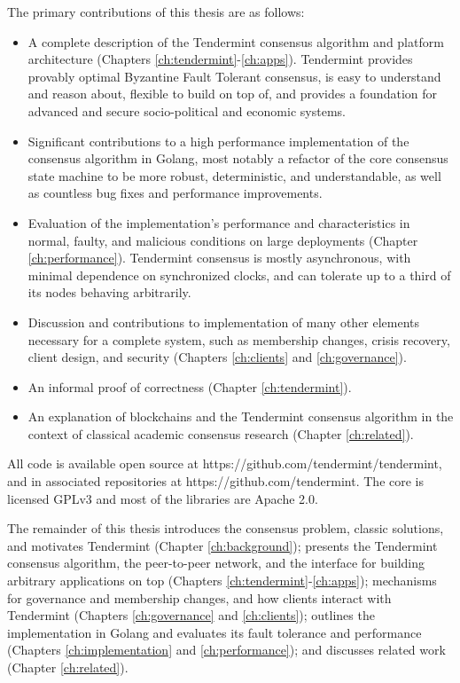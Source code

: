 The primary contributions of this thesis are as follows:


\begin{itemize}  

    \item A complete description of the Tendermint consensus algorithm and platform architecture (Chapters \ref{ch:tendermint}-\ref{ch:apps}). Tendermint provides provably optimal Byzantine Fault Tolerant consensus, is easy to understand and reason about, flexible to build on top of, and provides a foundation for advanced and secure socio-political and economic systems. 

    \item Significant contributions to a high performance implementation of the consensus algorithm in Golang, most notably a refactor of the core consensus state machine to be more robust, deterministic, and understandable, as well as countless bug fixes and performance improvements.

    \item Evaluation of the implementation's performance and characteristics in normal, faulty, and malicious conditions on large deployments (Chapter \ref{ch:performance}). Tendermint consensus is mostly asynchronous, with minimal dependence on synchronized clocks, and can tolerate up to a third of its nodes behaving arbitrarily. 

    \item Discussion and contributions to implementation of many other elements necessary for a complete system, such as membership changes, crisis recovery, client design, and security (Chapters \ref{ch:clients} and \ref{ch:governance}).

    \item An informal proof of correctness (Chapter \ref{ch:tendermint}).

    \item An explanation of blockchains and the Tendermint consensus algorithm in the context of classical academic consensus research (Chapter \ref{ch:related}).
\end{itemize}

All code is available open source at https://github.com/tendermint/tendermint, and in associated repositories at https://github.com/tendermint. 
The core is licensed GPLv3 and most of the libraries are Apache 2.0.

The remainder of this thesis introduces the consensus problem, 
classic solutions, and motivates Tendermint (Chapter \ref{ch:background});
presents the Tendermint consensus algorithm, 
the peer-to-peer network, 
and the interface for building arbitrary applications on top 
(Chapters \ref{ch:tendermint}-\ref{ch:apps});
mechanisms for governance and membership changes, and how clients interact with Tendermint (Chapters \ref{ch:governance} and \ref{ch:clients});
outlines the implementation in Golang and evaluates its fault tolerance and performance (Chapters \ref{ch:implementation} and \ref{ch:performance});
and discusses related work (Chapter \ref{ch:related}).
